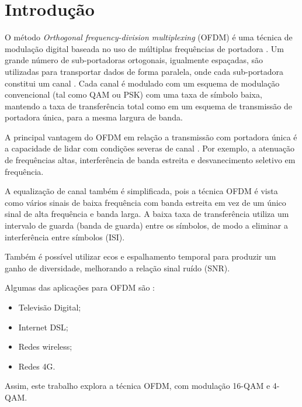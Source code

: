 \newpage
\section{Introdução}

O método \textit{Orthogonal frequency-division multiplexing} (OFDM) é uma técnica de modulação digital baseada no uso de múltiplas frequências de portadora \cite{Proakis}. Um grande número de sub-portadoras ortogonais, igualmente espaçadas, são utilizadas para transportar dados de forma paralela, onde cada sub-portadora constitui um canal \cite{Lathi}. Cada canal é modulado com um esquema de modulação convencional (tal como QAM ou PSK) com uma taxa de símbolo baixa, mantendo a taxa de transferência total como em um esquema de transmissão de portadora única, para a mesma largura de banda.

A principal vantagem do OFDM em relação a transmissão com portadora única é a capacidade de lidar com condições severas de canal \cite{Stallings}. Por exemplo, a atenuação de frequências altas, interferência de banda estreita e desvanecimento seletivo em frequência.

A equalização de canal também é simplificada, pois a técnica OFDM é vista como vários sinais de baixa frequência com banda estreita em vez de um único sinal de alta frequência e banda larga. A baixa taxa de transferência utiliza um intervalo de guarda (banda de guarda) entre os símbolos, de modo a eliminar a interferência entre símbolos (ISI).

Também é possível utilizar ecos e espalhamento temporal para produzir um ganho de diversidade, melhorando a relação sinal ruído (SNR).

Algumas das aplicações para OFDM são \cite{Proakis}:

\begin{itemize}
  \item Televisão Digital;

  \item Internet DSL;
  
  \item Redes wireless;
  
  \item Redes 4G.
\end{itemize}

Assim, este trabalho explora a técnica OFDM, com modulação 16-QAM e 4-QAM.